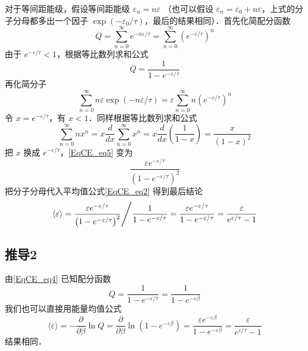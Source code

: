 对于等间距能级，假设等间距能级 ${\varepsilon _n} = n\varepsilon$ （也可以假设 ${\varepsilon _n} = {\varepsilon _0} + n\varepsilon $，上式的分子分母都多出一个因子 $\exp ( - {\varepsilon _0}/\tau )$，最后的结果相同）．首先化简配分函数
\begin{equation}
Q = \sum\limits_{n = 0}^\infty  {{e^{ - n\varepsilon /\tau }}}  = \sum\limits_{n = 0}^\infty  {{{\left( {{e^{ - \varepsilon /\tau }}} \right)}^n}} 
\end{equation}
由于 ${e^{ - \varepsilon /\tau }} < 1$，根据等比数列求和公式 %
\begin{equation}\label{EqCE_eq4}
Q = \frac{1}{{1 - {e^{ - \varepsilon /\tau }}}}
\end{equation}
再化简分子
\begin{equation}\label{EqCE_eq5}
\sum\limits_{n = 0}^\infty  {n\varepsilon \exp \left( { - n\varepsilon /\tau } \right)}  = \varepsilon \sum\limits_{n = 0}^\infty  {n{{\left( {{e^{ - \varepsilon /\tau }}} \right)}^n}}
\end{equation}
令 $x = {e^{ - \varepsilon /\tau }}$，有 $x < 1$．同样根据等比数列求和公式
\begin{equation}
\sum\limits_{n = 0}^\infty  {n{x^n}}  = x\frac{d}{{dx}}\sum\limits_{n = 0}^\infty  {{x^n}}  = x\frac{d}{{dx}}\left( {\frac{1}{{1 - x}}} \right) = \frac{x}{{{{\left( {1 - x} \right)}^2}}}
\end{equation}
把 $x$ 换成 ${e^{ - \varepsilon /\tau }}$，\autoref{EqCE_eq5} 变为
\begin{equation}
\frac{{\varepsilon {e^{ - \varepsilon /\tau }}}}{{{{\left( {1 - {e^{ - \varepsilon /\tau }}} \right)}^2}}}
\end{equation}
把分子分母代入平均值公式\autoref{EqCE_eq2} 得到最后结论
\begin{equation}
\left\langle \varepsilon  \right\rangle  = {{\frac{{\varepsilon {e^{ - \varepsilon /\tau }}}}{{{{\left( {1 - {e^{ - \varepsilon /\tau }}} \right)}^2}}}} \mathord{\left/
 {\vphantom {{\frac{{\varepsilon {e^{ - \varepsilon /\tau }}}}{{{{\left( {1 - {e^{ - \varepsilon /\tau }}} \right)}^2}}}} {\frac{1}{{1 - {e^{ - \varepsilon /\tau }}}}}}} \right.
 \kern-\nulldelimiterspace} {\frac{1}{{1 - {e^{ - \varepsilon /\tau }}}}}} = \frac{{\varepsilon {e^{ - \varepsilon /\tau }}}}{{1 - {e^{ - \varepsilon /\tau }}}} = \frac{\varepsilon }{{{e^{\varepsilon /\tau }} - 1}}
\end{equation}

\subsection{推导2}
由\autoref{EqCE_eq4} 已知配分函数
\begin{equation}
Q = \frac{1}{{1 - {e^{ - \varepsilon /\tau }}}} = \frac{1}{{1 - {e^{ - \varepsilon\beta }}}}
\end{equation}
我们也可以直接用能量均值公式
\begin{equation}
\langle\varepsilon\rangle = -\frac{\partial}{\partial\beta}\ln Q
= \frac{\partial }{{\partial \beta }}\ln (1 - {e^{ - \varepsilon \beta }}) = \frac{{\varepsilon {e^{ - \varepsilon \beta }}}}{{1 - {e^{ - \varepsilon \beta }}}} = \frac{\varepsilon }{{{e^{\varepsilon /\tau }} - 1}}
\end{equation}
结果相同．
